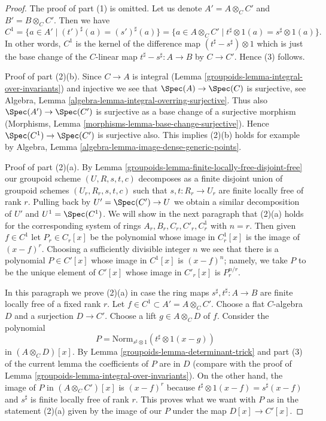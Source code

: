 \begin{proof}

The proof of part (1) is omitted. Let us denote $A' = A \otimes_C C'$ and
$B' = B \otimes_C C'$. Then we have
$$
C^1
= \{a \in A' \mid (t')^\sharp(a) = (s')^\sharp(a) \}
= \{a \in A \otimes_C C' \mid t^\sharp \otimes 1(a) = s^\sharp \otimes 1(a) \}.
$$
In other words, $C^1$ is the kernel of the difference map
$(t^\sharp - s^\sharp) \otimes 1$ which is just the base change
of the $C$-linear map $t^\sharp - s^\sharp : A \to B$ by $C \to C'$.
Hence (3) follows.

\medskip\noindent
Proof of part (2)(b). Since $C \to A$ is integral
(Lemma \ref{groupoids-lemma-integral-over-invariants}) and injective we see that
$\Spec(A) \to \Spec(C)$ is surjective, see
Algebra, Lemma \ref{algebra-lemma-integral-overring-surjective}.
Thus also $\Spec(A') \to \Spec(C')$ is surjective
as a base change of a surjective morphism
(Morphisms, Lemma \ref{morphisms-lemma-base-change-surjective}).
Hence $\Spec(C^1) \to \Spec(C')$ is surjective also.
This implies (2)(b) holds for example by
Algebra, Lemma \ref{algebra-lemma-image-dense-generic-points}.

\medskip\noindent
Proof of part (2)(a). By Lemma \ref{groupoids-lemma-finite-locally-free-disjoint-free}
our groupoid scheme $(U, R, s, t, c)$ decomposes as a finite disjoint union
of groupoid schemes $(U_r, R_r, s, t, c)$ such that $s, t : R_r \to U_r$
are finite locally free of rank $r$. Pulling back by $U' = \Spec(C') \to U$
we obtain a similar decomposition of $U'$ and $U^1 = \Spec(C^1)$.
We will show in the next paragraph that (2)(a) holds for the corresponding
system of rings $A_r, B_r, C_r, C'_r, C^1_r$ with $n = r$.
Then given $f \in C^1$ let $P_r \in C_r[x]$ be the polynomial
whose image in $C^1_r[x]$ is the image of $(x - f)^r$.
Choosing a sufficiently divisible integer $n$ we see that
there is a polynomial $P \in C'[x]$ whose image in $C^1[x]$ is
$(x - f)^n$; namely, we take $P$ to be the unique element of
$C'[x]$ whose image in $C'_r[x]$ is $P_r^{n/r}$.

\medskip\noindent
In this paragraph we prove (2)(a) in case the ring maps
$s^\sharp, t^\sharp : A \to B$ are finite locally free of a fixed rank $r$.
Let $f \in C^1 \subset A' = A \otimes_C C'$. Choose a flat
$C$-algebra $D$ and a surjection $D \to C'$. Choose a lift
$g \in A \otimes_C D$ of $f$.
Consider the polynomial
$$
P = \text{Norm}_{s^\sharp \otimes 1}(t^\sharp \otimes 1(x - g))
$$
in $(A \otimes_C D)[x]$. By Lemma \ref{groupoids-lemma-determinant-trick}
and part (3) of the current lemma the coefficients of $P$ are in $D$
(compare with the proof of Lemma \ref{groupoids-lemma-integral-over-invariants}).
On the other hand, the image of $P$ in $(A \otimes_C C')[x]$ is
$(x - f)^r$ because $t^\sharp \otimes 1(x - f) = s^\sharp(x - f)$
and $s^\sharp$ is finite locally free of rank $r$.
This proves what we want with $P$ as in the statement (2)(a)
given by the image of our $P$ under the map $D[x] \to C'[x]$.
\end{proof}

